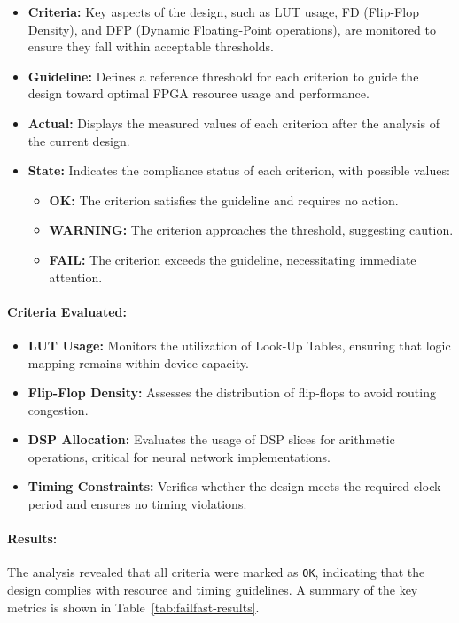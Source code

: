 \documentclass{article}
\begin{document}
\begin{itemize}
    \item \textbf{Criteria:} Key aspects of the design, such as LUT usage, FD (Flip-Flop Density), and DFP (Dynamic Floating-Point operations), are monitored to ensure they fall within acceptable thresholds.
    \item \textbf{Guideline:} Defines a reference threshold for each criterion to guide the design toward optimal FPGA resource usage and performance.
    \item \textbf{Actual:} Displays the measured values of each criterion after the analysis of the current design.
    \item \textbf{State:} Indicates the compliance status of each criterion, with possible values:
    \begin{itemize}
        \item \textbf{OK:} The criterion satisfies the guideline and requires no action.
        \item \textbf{WARNING:} The criterion approaches the threshold, suggesting caution.
        \item \textbf{FAIL:} The criterion exceeds the guideline, necessitating immediate attention.
    \end{itemize}
\end{itemize}

\paragraph{Criteria Evaluated:}
\begin{itemize}
    \item \textbf{LUT Usage:} Monitors the utilization of Look-Up Tables, ensuring that logic mapping remains within device capacity.
    \item \textbf{Flip-Flop Density:} Assesses the distribution of flip-flops to avoid routing congestion.
    \item \textbf{DSP Allocation:} Evaluates the usage of DSP slices for arithmetic operations, critical for neural network implementations.
    \item \textbf{Timing Constraints:} Verifies whether the design meets the required clock period and ensures no timing violations.
\end{itemize}

\paragraph{Results:}
The analysis revealed that all criteria were marked as \texttt{OK}, indicating that the design complies with resource and timing guidelines. A summary of the key metrics is shown in Table~\ref{tab:failfast-results}.
\end{document}
